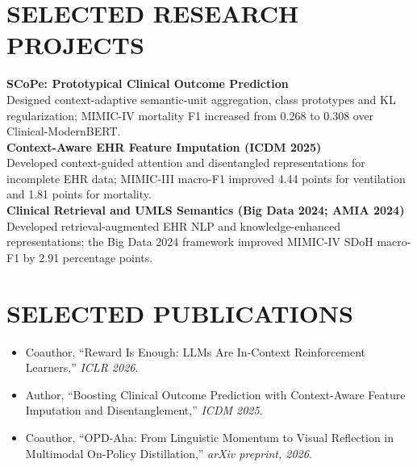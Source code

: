 \documentclass[10pt, letterpaper]{article}
\begin{document}
\section{SELECTED RESEARCH PROJECTS}
\textbf{SCoPe: Prototypical Clinical Outcome Prediction}\\[-1pt]
Designed context-adaptive semantic-unit aggregation, class prototypes and KL regularization; MIMIC-IV mortality F1 increased from 0.268 to 0.308 over Clinical-ModernBERT.\\[3pt]
\textbf{Context-Aware EHR Feature Imputation (ICDM 2025)}\\[-1pt]
Developed context-guided attention and disentangled representations for incomplete EHR data; MIMIC-III macro-F1 improved 4.44 points for ventilation and 1.81 points for mortality.\\[3pt]
\textbf{Clinical Retrieval and UMLS Semantics (Big Data 2024; AMIA 2024)}\\[-1pt]
Developed retrieval-augmented EHR NLP and knowledge-enhanced representations; the Big Data 2024 framework improved MIMIC-IV SDoH macro-F1 by 2.91 percentage points.\\[3pt]
\section{SELECTED PUBLICATIONS}
\begin{itemize}
\item Coauthor, ``Reward Is Enough: LLMs Are In-Context Reinforcement Learners,'' \textit{ICLR 2026}.
\item Author, ``Boosting Clinical Outcome Prediction with Context-Aware Feature Imputation and Disentanglement,'' \textit{ICDM 2025}.
\item Coauthor, ``OPD-Aha: From Linguistic Momentum to Visual Reflection in Multimodal On-Policy Distillation,'' \textit{arXiv preprint, 2026}.
\end{itemize}
\end{document}

